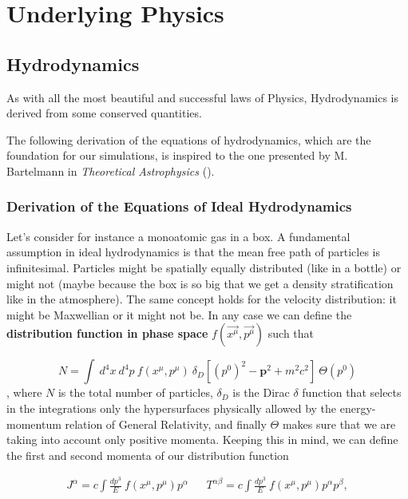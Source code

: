 
\chapter{Underlying Physics}
\section{Hydrodynamics}
As with all the most beautiful and successful laws of Physics, Hydrodynamics is derived from some conserved quantities. 

The following derivation of the equations of hydrodynamics, which are the foundation for our simulations, is inspired to the one presented by M. Bartelmann in \textit{Theoretical Astrophysics} (\citet{theoastro}). 
\subsection{Derivation of the Equations of Ideal Hydrodynamics}

Let's consider for instance a monoatomic gas in a box. A fundamental assumption in ideal hydrodynamics is that the mean free path of particles is infinitesimal. Particles might be spatially equally distributed (like in a bottle) or might not (maybe because the box is so big that we get a density stratification like in the atmosphere). The same concept holds for the velocity distribution: it might be Maxwellian or it might not be. 
In any case we can define the \textbf{distribution function in phase space} $f( \vec{x^{\mu}}, \vec{p^{\mu}})$ such that

$$N=\int \ d^4x \ d^4p \ f( x^{\mu}, p^{\mu}) \  \delta_D[(p^0)^2-\mathbf{p}^2+m^2c^2] \  \Theta(p^0)$$,
 where $N$ is the total number of particles, $\delta_D$ is the Dirac $\delta$ function that selects in the integrations only the hypersurfaces physically allowed by the energy-momentum relation of General Relativity, and finally $\Theta$ makes sure that we are taking into account only positive momenta. 
Keeping this in mind, we can define the first and second momenta of our distribution function

\begin{align}
J^{\alpha}= c \int \frac{dp^3}{E} \ f( x^{\mu}, p^{\mu}) p^{\alpha}  &&   T^{\alpha \beta}= c \int \frac{dp^3}{E} \ f( x^{\mu}, p^{\mu}) p^{\alpha}p^{\beta}, 
\end{align}
 
